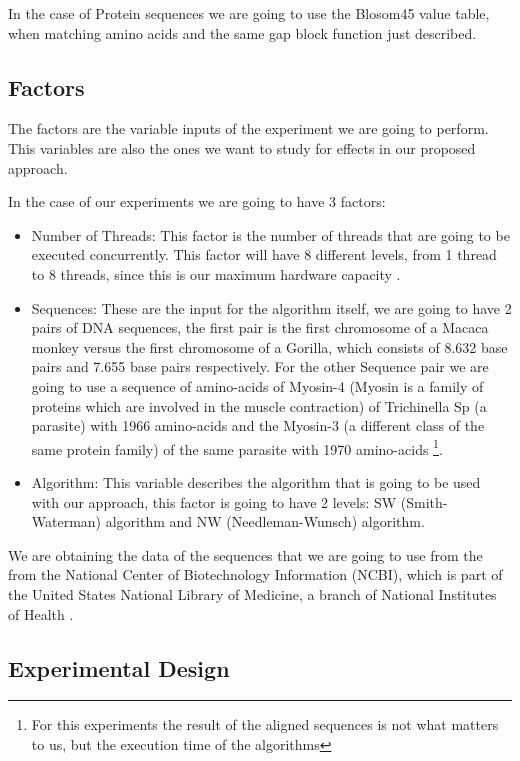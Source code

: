 \documentclass[journal]{IEEEtran}
\begin{document}
In the case of Protein sequences we are going to use the Blosom45 value table, when matching amino acids and the same gap block function just described.


\subsection{Factors}

The factors are the variable inputs of the experiment we are going to perform. This variables are also the ones we want to study for effects in our proposed approach. 

In the case of our experiments we are going to have 3 factors:

\begin{itemize}
    \item Number of Threads: This factor is the number of threads that are going to be executed concurrently. This factor will have 8 different levels, from 1 thread to 8 threads, since this is our maximum hardware capacity .
    \item Sequences: These are the input for the algorithm itself, we are going to have 2 pairs of DNA sequences, the first pair is the first chromosome of a Macaca monkey versus the first chromosome of a Gorilla, which consists of 8.632 base pairs and 7.655 base pairs respectively. For the other Sequence pair we are going to use a sequence of amino-acids of Myosin-4 (Myosin is a family of proteins which are involved in the muscle contraction) of Trichinella Sp (a parasite)  with 1966 amino-acids and the Myosin-3 (a different class of the same protein family) of the same parasite with 1970 amino-acids \footnote{For this experiments the result of the aligned sequences is not what matters to us, but the execution time of the algorithms}.
    \item Algorithm: This variable describes the algorithm that is going to be used with our approach, this factor is going to have 2 levels: SW (Smith-Waterman) algorithm and NW (Needleman-Wunsch) algorithm. 
\end{itemize}

We are obtaining the data of the sequences that we are going to use from the from the National Center of Biotechnology Information (NCBI), which is part of the United States National Library of Medicine, a branch of National Institutes of Health \cite{NCBI}. 

\subsection{Experimental Design}
\end{document}
